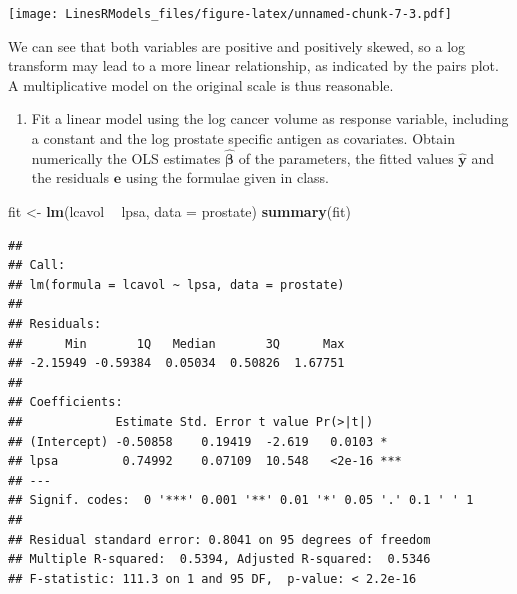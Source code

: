 \documentclass[]{book}
\newenvironment{Shaded}{\begin{snugshade}}{\end{snugshade}}
\newcommand{\KeywordTok}[1]{\textcolor[rgb]{0.13,0.29,0.53}{\textbf{#1}}}
\newcommand{\DataTypeTok}[1]{\textcolor[rgb]{0.13,0.29,0.53}{#1}}
\newcommand{\StringTok}[1]{\textcolor[rgb]{0.31,0.60,0.02}{#1}}
\newcommand{\OperatorTok}[1]{\textcolor[rgb]{0.81,0.36,0.00}{\textbf{#1}}}
\newcommand{\NormalTok}[1]{#1}
\providecommand{\tightlist}{%
  \setlength{\itemsep}{0pt}\setlength{\parskip}{0pt}}
\theoremstyle{definition}
\theoremstyle{definition}
\theoremstyle{definition}
\theoremstyle{remark}
\begin{document}
\texttt{[image: LinesRModels\_files/figure-latex/unnamed-chunk-7-3.pdf]}

We can see that both variables are positive and positively skewed, so a
log transform may lead to a more linear relationship, as indicated by
the pairs plot. A multiplicative model on the original scale is thus
reasonable.

\begin{enumerate}
\def\labelenumi{\alph{enumi}.}
\setcounter{enumi}{3}
\tightlist
\item
  Fit a linear model using the log cancer volume as response variable,
  including a constant and the log prostate specific antigen as
  covariates. Obtain numerically the OLS estimates
  \(\hat{\boldsymbol{\beta}}\) of the parameters, the fitted values
  \(\hat{\boldsymbol{y}}\) and the residuals \(\boldsymbol{e}\) using
  the formulae given in class.
\end{enumerate}

\begin{Shaded}
\begin{Highlighting}[]
\NormalTok{fit <-}\StringTok{ }\KeywordTok{lm}\NormalTok{(lcavol }\OperatorTok{~}\StringTok{ }\NormalTok{lpsa, }\DataTypeTok{data =}\NormalTok{ prostate)}
\KeywordTok{summary}\NormalTok{(fit)}
\end{Highlighting}
\end{Shaded}

\begin{verbatim}
## 
## Call:
## lm(formula = lcavol ~ lpsa, data = prostate)
## 
## Residuals:
##      Min       1Q   Median       3Q      Max 
## -2.15949 -0.59384  0.05034  0.50826  1.67751 
## 
## Coefficients:
##             Estimate Std. Error t value Pr(>|t|)    
## (Intercept) -0.50858    0.19419  -2.619   0.0103 *  
## lpsa         0.74992    0.07109  10.548   <2e-16 ***
## ---
## Signif. codes:  0 '***' 0.001 '**' 0.01 '*' 0.05 '.' 0.1 ' ' 1
## 
## Residual standard error: 0.8041 on 95 degrees of freedom
## Multiple R-squared:  0.5394, Adjusted R-squared:  0.5346 
## F-statistic: 111.3 on 1 and 95 DF,  p-value: < 2.2e-16
\end{verbatim}
\end{document}
